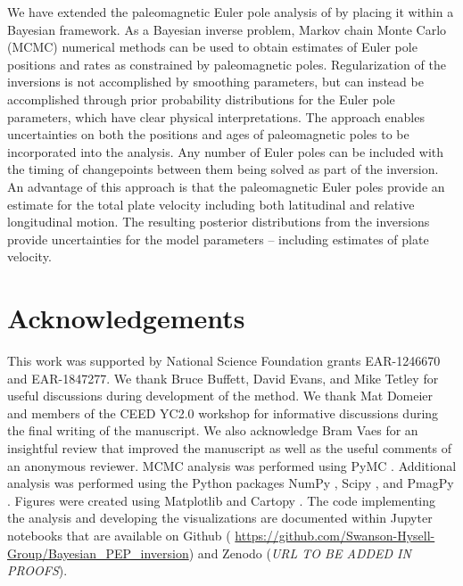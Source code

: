 \documentclass[11pt,letterpaper]{article}
\begin{document}
We have extended the paleomagnetic Euler pole analysis of \cite{Gordon1984a} by placing it within a Bayesian framework. As a Bayesian inverse problem, Markov chain Monte Carlo (MCMC) numerical methods can be used to obtain estimates of Euler pole positions and rates as constrained by paleomagnetic poles. Regularization of the inversions is not accomplished by smoothing parameters, but can instead be accomplished through prior probability distributions for the Euler pole parameters, which have clear physical interpretations. The approach enables uncertainties on both the positions and ages of paleomagnetic poles to be incorporated into the analysis. Any number of Euler poles can be included with the timing of changepoints between them being solved as part of the inversion. An advantage of this approach is that the paleomagnetic Euler poles provide an estimate for the total plate velocity including both latitudinal and relative longitudinal motion. The resulting posterior distributions from the inversions provide uncertainties for the model parameters -- including estimates of plate velocity. 

\section*{Acknowledgements}
\label{sec:acknowledgements}
This work was supported by National Science Foundation grants EAR-1246670 and EAR-1847277. We thank Bruce Buffett, David Evans, and Mike Tetley for useful discussions during development of the method. We thank Mat Domeier and members of the CEED YC2.0 workshop for informative discussions during the final writing of the manuscript. We also acknowledge Bram Vaes for an insightful review that improved the manuscript as well as the useful comments of an anonymous reviewer. MCMC analysis was performed using PyMC \citep{Salvatier2016a}. Additional analysis was performed using the Python packages NumPy \citep{Harris2020a}, Scipy \citep{Virtanen2020a}, and PmagPy \citep{Tauxe2016a}. Figures were created using Matplotlib \citep{Hunter2007a} and Cartopy \citep{Met-Office2010a}. The code implementing the analysis and developing the visualizations are documented within Jupyter notebooks \citep{Kluyver2016a} that are available on Github ( \url{https://github.com/Swanson-Hysell-Group/Bayesian_PEP_inversion}) and Zenodo (\textit{URL TO BE ADDED IN PROOFS}).

\footnotesize

\singlespacing



\end{document}
